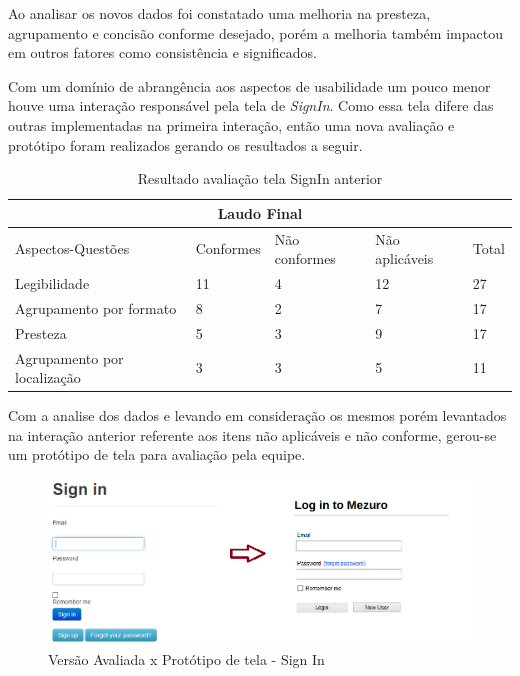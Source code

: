 Ao analisar os novos dados foi constatado uma melhoria na presteza, agrupamento e concisão conforme desejado, porém a melhoria também impactou em outros fatores como consistência e significados.

Com um domínio de abrangência aos aspectos de usabilidade um pouco menor houve uma interação responsável pela tela de \textit{SignIn}. Como essa tela difere das outras implementadas na primeira interação, então uma nova avaliação e protótipo foram realizados gerando os resultados a seguir.

\begin{table}[H]
\begin{tabular}{|l|l|l|l|l|}
\hline
\multicolumn{5}{|c|}{\textbf{Laudo Final}}                                       \\ \hline
Aspectos-Questões           & Conformes & Não conformes & Não aplicáveis & Total \\ \hline
Legibilidade                & 11        & 4             & 12             & 27    \\ \hline
Agrupamento por formato     & 8         & 2             & 7              & 17    \\ \hline
Presteza                    & 5         & 3             & 9              & 17    \\ \hline
Agrupamento por localização & 3         & 3             & 5              & 11    \\ \hline
\end{tabular}
\caption{Resultado avaliação tela SignIn anterior}
\end{table}

Com a analise dos dados e levando em consideração os mesmos porém levantados na interação anterior referente aos itens não aplicáveis e não conforme, gerou-se um protótipo de tela para avaliação pela equipe.

\graphicspath{{figuras/}}
\begin{figure}[H]
\centering
\includegraphics[width=1.0\textwidth]{PrototipoSignIn}
\caption{Versão Avaliada x Protótipo de tela - Sign In}
\label{parallel-coordinate}
\end{figure}


